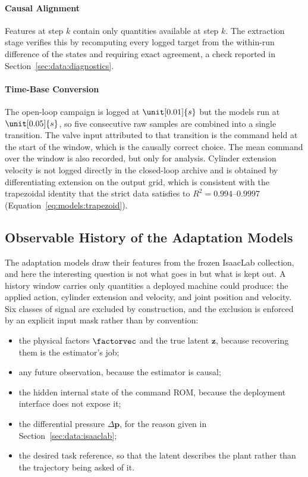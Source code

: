 \paragraph{Causal Alignment}
Features at step $k$ contain only quantities available at step $k$. The
extraction stage verifies this by recomputing every logged target from
the within-run difference of the states and requiring exact agreement,
a check reported in Section~\ref{sec:data:diagnostics}.

\paragraph{Time-Base Conversion}
The open-loop campaign is logged at $\unit[0.01]{s}$ but the models run
at $\unit[0.05]{s}$, so five consecutive raw samples are combined into a
single transition. The valve input attributed to that transition is the
command held at the start of the window, which is the causally correct
choice. The mean command over the window is also recorded, but only for
analysis. Cylinder extension velocity is not logged directly in the
closed-loop archive and is obtained by differentiating extension on the
output grid, which is consistent with the trapezoidal identity that the
strict data satisfies to $R^2 = 0.994$--$0.9997$
(Equation~\ref{eq:models:trapezoid}).

\subsection{Observable History of the Adaptation Models}
\label{sec:data:history-features}

The adaptation models draw their features from the frozen IsaacLab
collection, and here the interesting question is not what goes in but
what is kept out. A history window carries only quantities a deployed
machine could produce: the applied action, cylinder extension and
velocity, and joint position and velocity. Six classes of signal are
excluded by construction, and the exclusion is enforced by an explicit
input mask rather than by convention:

\begin{itemize}
  \item the physical factors $\factorvec$ and the true latent $\bm{z}$,
    because recovering them is the estimator's job;
  \item any future observation, because the estimator is causal;
  \item the hidden internal state of the command ROM, because the
    deployment interface does not expose it;
  \item the differential pressure $\Delta\bm{p}$, for the reason given
    in Section~\ref{sec:data:isaaclab};
  \item the desired task reference, so that the latent describes the
    plant rather than the trajectory being asked of it.
\end{itemize}

